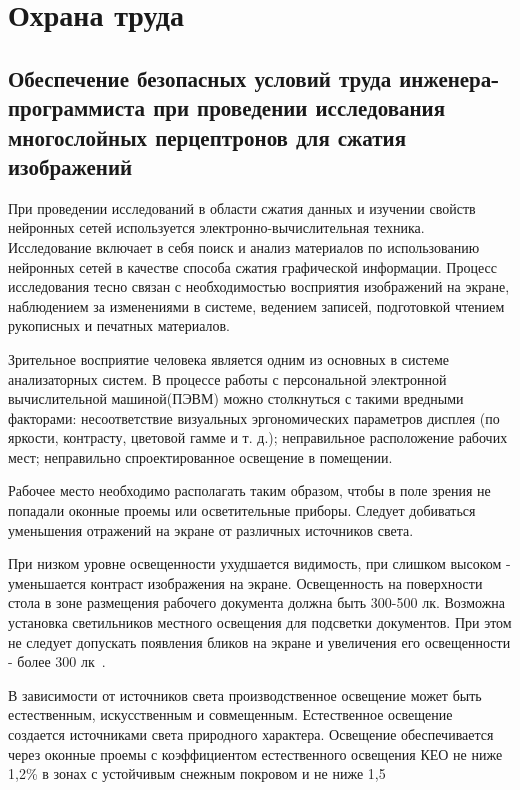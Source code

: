 \section{Охрана труда}

\subsection{Обеспечение безопасных условий труда инженера-программиста при проведении исследования многослойных перцептронов для сжатия изображений}

При проведении исследований в области сжатия данных и изучении свойств нейронных сетей используется электронно-вычислительная техника.
Исследование включает в себя поиск и анализ материалов по использованию нейронных сетей в качестве способа сжатия графической информации.
Процесс исследования тесно связан с необходимостью восприятия изображений на экране, наблюдением за изменениями в системе, ведением записей, подготовкой чтением рукописных и печатных материалов.

Зрительное восприятие человека является одним из основных в системе анализаторных систем.
В процессе работы с персональной электронной вычислительной машиной(ПЭВМ) можно столкнуться с такими вредными факторами: несоответствие визуальных эргономических параметров дисплея (по яркости, контрасту, цветовой гамме и т. д.); неправильное расположение рабочих мест; неправильно спроектированное освещение в помещении.

Рабочее место необходимо располагать таким образом, чтобы в поле зрения не попадали оконные проемы или осветительные приборы. Следует добиваться уменьшения отражений на экране от различных источников света.

При низком уровне освещенности ухудшается видимость, при слишком высоком - уменьшается контраст изображения на экране.
Освещенность на поверхности стола в зоне размещения рабочего документа должна быть 300-500 лк.
Возможна установка светильников местного освещения для подсветки документов.
При этом не следует допускать появления бликов на экране и увеличения его освещенности - более 300 лк~\cite{ot_electric_lighting}.

В зависимости от источников света производственное освещение может быть естественным, искусственным и совмещенным.
Естественное освещение создается источниками света природного характера.
Освещение обеспечивается через оконные проемы с коэффициентом естественного освещения КЕО не ниже 1,2\% в зонах с устойчивым снежным покровом и не ниже 1,5%

